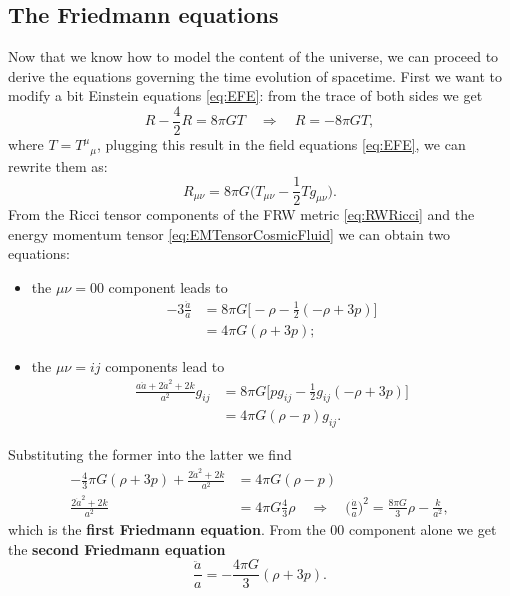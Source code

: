\subsection{The Friedmann equations}
Now that we know how to model the content of the universe, we can proceed to derive the equations governing the time evolution of spacetime. First we want to modify a bit Einstein equations \eqref{eq:EFE}: from the trace of both sides we get
\begin{equation*}
    R-\frac{4}{2}R=8\pi GT\quad\Rightarrow\quad R=-8\pi GT,
\end{equation*}
where $T=T^\mu\phantom{}_\mu$, plugging this result in the field equations \eqref{eq:EFE}, we can rewrite them as:\begin{equation*}
    R_{\mu\nu}=8\pi G\bigg(T_{\mu\nu}-\frac{1}{2}Tg_{\mu\nu}\bigg).
\end{equation*}
From the Ricci tensor components of the FRW metric \eqref{eq:RWRicci} and the energy momentum tensor \eqref{eq:EMTensorCosmicFluid} we can obtain two equations:
\begin{itemize}
    \item the $\mu\nu=00$ component leads to
    \begin{align*}
        -3\frac{\ddot a}{a}&=8\pi G\bigg[-\rho-\frac{1}{2}(-\rho+3p)\bigg]\\&=4\pi G(\rho+3p);
    \end{align*}
    \item the $\mu\nu=ij$ components lead to
    \begin{align*}
        \frac{a\ddot a+2\dot a^2+2k}{a^2}g_{ij}&=8\pi G\bigg[pg_{ij}-\frac{1}{2}g_{ij}(-\rho+3p)\bigg]\\&=4\pi G(\rho-p)g_{ij}.
    \end{align*}
\end{itemize}
Substituting the former into the latter we find
\begin{align}
   -\frac{4}{3}\pi G(\rho+3p) +\frac{2\dot a^2+2k}{a^2}&=4\pi G(\rho-p)\nonumber\\\frac{2\dot a^2+2k}{a^2}&=4\pi G\frac{4}{3}\rho\quad\Rightarrow\quad  \boxed{\bigg(\frac{\dot a }{a}\bigg)^2=\frac{8\pi G}{3}\rho-\frac{k}{a^2}}\label{eq:Friedmann1},
\end{align}
which is the \textbf{first Friedmann equation}. From the $00$ component alone we get the \textbf{second Friedmann equation}
\begin{equation}
    \label{eq:Friedmann2}\boxed{\frac{\ddot a}{a}=-\frac{4\pi G}{3}(\rho+3p)}.
\end{equation}
